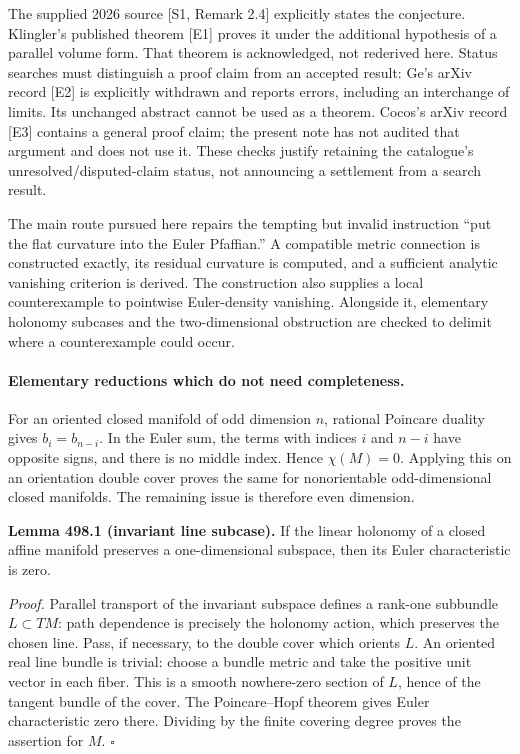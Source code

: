 \documentclass[11pt]{article}
\begin{document}
The supplied 2026 source [S1, Remark 2.4] explicitly states the conjecture.
Klingler's published theorem [E1] proves it under the additional hypothesis
of a parallel volume form. That theorem is acknowledged, not rederived
here. Status searches must distinguish a proof claim from an accepted
result: Ge's arXiv record [E2] is explicitly withdrawn and reports errors,
including an interchange of limits. Its unchanged abstract cannot be used
as a theorem. Cocos's arXiv record [E3] contains a general proof claim;
the present note has not audited that argument and does not use it. These
checks justify retaining the catalogue's unresolved/disputed-claim status,
not announcing a settlement from a search result.

The main route pursued here repairs the tempting but invalid instruction
``put the flat curvature into the Euler Pfaffian.'' A compatible metric
connection is constructed exactly, its residual curvature is computed,
and a sufficient analytic vanishing criterion is derived. The construction
also supplies a local counterexample to pointwise Euler-density vanishing.
Alongside it, elementary holonomy subcases and the two-dimensional
obstruction are checked to delimit where a counterexample could occur.

\paragraph{Elementary reductions which do not need completeness.}
For an oriented closed manifold of odd dimension $n$, rational Poincare
duality gives $b_i=b_{n-i}$. In the Euler sum, the terms with indices $i$
and $n-i$ have opposite signs, and there is no middle index. Hence
$\chi(M)=0$. Applying this on an orientation double cover proves the same
for nonorientable odd-dimensional closed manifolds. The remaining issue
is therefore even dimension.

\textbf{Lemma 498.1 (invariant line subcase).}
If the linear holonomy of a closed affine manifold preserves a
one-dimensional subspace, then its Euler characteristic is zero.

\emph{Proof.}
Parallel transport of the invariant subspace defines a rank-one subbundle
$L\subset TM$: path dependence is precisely the holonomy action, which
preserves the chosen line. Pass, if necessary, to the double cover which
orients $L$. An oriented real line bundle is trivial: choose a bundle
metric and take the positive unit vector in each fiber. This is a smooth
nowhere-zero section of $L$, hence of the tangent bundle of the cover.
The Poincare--Hopf theorem gives Euler characteristic zero there. Dividing
by the finite covering degree proves the assertion for $M$.
\hfill$\square$
\end{document}
